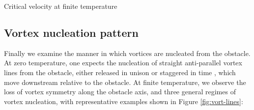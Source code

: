 \begin{chapter}{\label{cha:nonequib}Critical velocity at finite temperature}
\subsection{Vortex nucleation pattern}
Finally we examine the manner in which vortices are nucleated from the obstacle.  At zero temperature, one expects the nucleation of straight anti-parallel vortex lines from the obstacle, either released in unison or staggered in time \cite{frisch92,saito10,stagg_parker_14}, which move downstream relative to the obstacle.  At finite temperature, we observe the loss of vortex symmetry along the obstacle axis, and three general regimes of vortex nucleation, with representative examples shown in Figure  \ref{fig:vort-lines}:

\begin{figure}
    \centering
\end{figure}
\end{chapter}
